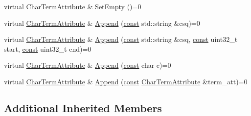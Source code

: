 \begin{DoxyCompactItemize}
\item 
virtual \mbox{\hyperlink{classlucene_1_1core_1_1analysis_1_1tokenattributes_1_1CharTermAttribute}{Char\+Term\+Attribute}} \& \mbox{\hyperlink{classlucene_1_1core_1_1analysis_1_1tokenattributes_1_1CharTermAttribute_ac14e6e064418d1d56b0f33724dcfe8b0}{Set\+Empty}} ()=0
\item 
virtual \mbox{\hyperlink{classlucene_1_1core_1_1analysis_1_1tokenattributes_1_1CharTermAttribute}{Char\+Term\+Attribute}} \& \mbox{\hyperlink{classlucene_1_1core_1_1analysis_1_1tokenattributes_1_1CharTermAttribute_a721493e2513c3cbb5818cab4ec36e277}{Append}} (\mbox{\hyperlink{ZlibCrc32_8h_a2c212835823e3c54a8ab6d95c652660e}{const}} std\+::string \&csq)=0
\item 
virtual \mbox{\hyperlink{classlucene_1_1core_1_1analysis_1_1tokenattributes_1_1CharTermAttribute}{Char\+Term\+Attribute}} \& \mbox{\hyperlink{classlucene_1_1core_1_1analysis_1_1tokenattributes_1_1CharTermAttribute_a1fc0d3eaff550a10e8fc17a5e7bb98bc}{Append}} (\mbox{\hyperlink{ZlibCrc32_8h_a2c212835823e3c54a8ab6d95c652660e}{const}} std\+::string \&csq, \mbox{\hyperlink{ZlibCrc32_8h_a2c212835823e3c54a8ab6d95c652660e}{const}} uint32\+\_\+t start, \mbox{\hyperlink{ZlibCrc32_8h_a2c212835823e3c54a8ab6d95c652660e}{const}} uint32\+\_\+t end)=0
\item 
virtual \mbox{\hyperlink{classlucene_1_1core_1_1analysis_1_1tokenattributes_1_1CharTermAttribute}{Char\+Term\+Attribute}} \& \mbox{\hyperlink{classlucene_1_1core_1_1analysis_1_1tokenattributes_1_1CharTermAttribute_a069f61e1cb30895a205e615c1d154148}{Append}} (\mbox{\hyperlink{ZlibCrc32_8h_a2c212835823e3c54a8ab6d95c652660e}{const}} char c)=0
\item 
virtual \mbox{\hyperlink{classlucene_1_1core_1_1analysis_1_1tokenattributes_1_1CharTermAttribute}{Char\+Term\+Attribute}} \& \mbox{\hyperlink{classlucene_1_1core_1_1analysis_1_1tokenattributes_1_1CharTermAttribute_ad8624358a4798446a14fbf35991c43ad}{Append}} (\mbox{\hyperlink{ZlibCrc32_8h_a2c212835823e3c54a8ab6d95c652660e}{const}} \mbox{\hyperlink{classlucene_1_1core_1_1analysis_1_1tokenattributes_1_1CharTermAttribute}{Char\+Term\+Attribute}} \&term\+\_\+att)=0
\end{DoxyCompactItemize}
\subsection*{Additional Inherited Members}


